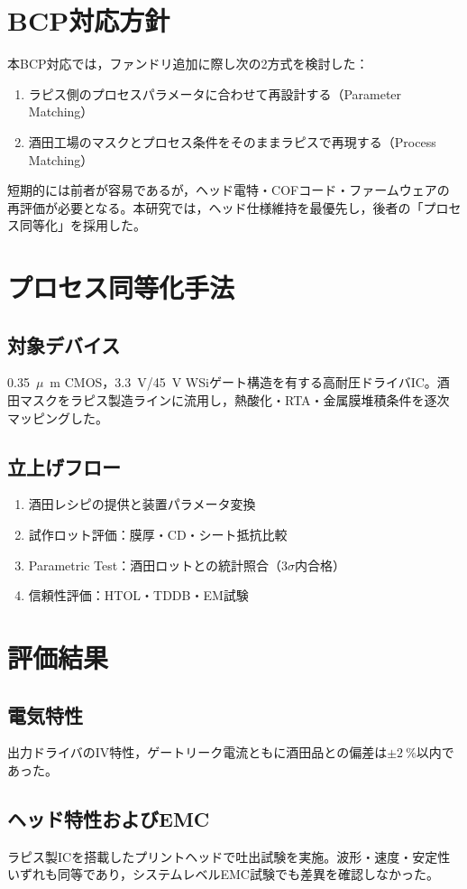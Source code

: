 \documentclass[conference]{IEEEtran}
\newcommand{\micro}{\ensuremath{\mu}} %
\begin{document}
\section{BCP対応方針}
本BCP対応では，ファンドリ追加に際し次の2方式を検討した：
\begin{enumerate}
\item ラピス側のプロセスパラメータに合わせて再設計する（Parameter Matching）
\item 酒田工場のマスクとプロセス条件をそのままラピスで再現する（Process Matching）
\end{enumerate}
短期的には前者が容易であるが，ヘッド電特・COFコード・ファームウェアの再評価が必要となる。本研究では，ヘッド仕様維持を最優先し，後者の「プロセス同等化」を採用した。

\section{プロセス同等化手法}
\subsection{対象デバイス}
\SI{0.35}{\micro\meter} CMOS，\SI{3.3}{\volt}/\SI{45}{\volt} WSiゲート構造を有する高耐圧ドライバIC。酒田マスクをラピス製造ラインに流用し，熱酸化・RTA・金属膜堆積条件を逐次マッピングした。

\subsection{立上げフロー}
\begin{enumerate}
\item 酒田レシピの提供と装置パラメータ変換
\item 試作ロット評価：膜厚・CD・シート抵抗比較
\item Parametric Test：酒田ロットとの統計照合（$3\sigma$内合格）
\item 信頼性評価：HTOL・TDDB・EM試験
\end{enumerate}

\section{評価結果}
\subsection{電気特性}
出力ドライバのIV特性，ゲートリーク電流ともに酒田品との偏差は$\pm\SI{2}{\percent}$以内であった。

\subsection{ヘッド特性およびEMC}
ラピス製ICを搭載したプリントヘッドで吐出試験を実施。波形・速度・安定性いずれも同等であり，システムレベルEMC試験でも差異を確認しなかった。
\end{document}
